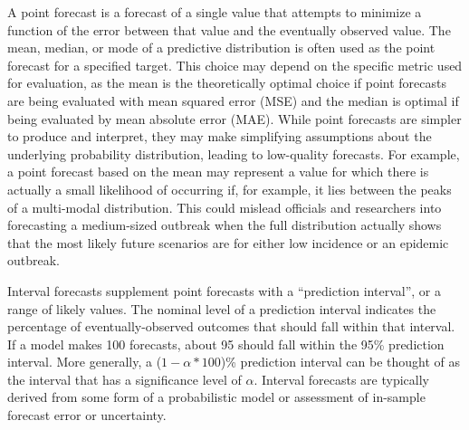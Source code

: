 \documentclass[a4paper]{article}
\begin{document}
A point forecast is a forecast of a single value that attempts to minimize a function of the error between that value and the eventually observed value.
The mean, median, or mode of a predictive distribution is often used as the point forecast for a specified target.
This choice may depend on the specific metric used for evaluation, as the mean is the theoretically optimal choice if point forecasts are being evaluated with mean squared error (MSE) and the median is optimal if being evaluated by mean absolute error (MAE).\cite{Reich2016} 
While point forecasts are simpler to produce and interpret, they may make simplifying assumptions about the underlying probability distribution, leading to low-quality forecasts.
For example, a point forecast based on the mean may represent a value for which there is actually a small likelihood of occurring if, for example, it lies between the peaks of a multi-modal distribution.
This could mislead officials and researchers into forecasting a medium-sized outbreak when the full distribution actually shows that the most likely future scenarios are for either low incidence or an epidemic outbreak.

Interval forecasts supplement point forecasts with a ``prediction interval'', or a range of likely values.
The nominal level of a prediction interval indicates the percentage of eventually-observed outcomes that should fall within that interval.
If a model makes 100 forecasts, about 95 should fall within the 95\% prediction interval.
More generally, a ($1-\alpha*100$)\% prediction interval can be thought of as the interval that has a significance level of $\alpha$.
Interval forecasts are typically derived from some form of a probabilistic model or assessment of in-sample forecast error or uncertainty. 
\end{document}
